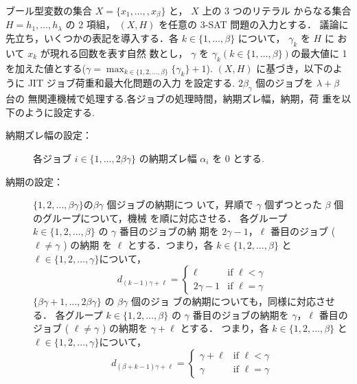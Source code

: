 \documentclass[12pt]{optlab-bachelor}
\begin{document}
ブール型変数の集合 $X = \{x_1,\ldots,,x_β\}$ と， $X$ 上の 3 つのリテラル
からなる集合 $H = {h_1,\ldots,h_{\lambda}}$ の 2 項組， $(X,H)$ を任意の
\textsc{3-SAT} 問題の入力とする．
議論に先立ち，いくつかの表記を導入する．各 $k \in \{1,\ldots,\beta\}$
について， $\gamma_k$ を $H$ に おいて $x_k$ が現れる回数を表す自然
数とし， $\gamma$ を $\gamma_k ( k \in \{1,\ldots,\beta\} )$の最大値に
1 を加えた値とする($\displaystyle \gamma = \max_{k \in \{1,2,\ldots, \beta\}} \{\gamma_k \}+ 1$).
$(X, H)$ に基づき，以下のように JIT ジョブ荷重和最大化問題の入力
を設定する. $2\beta_{\gamma}$ 個のジョブを $\lambda + \beta$ 台の
無関連機械で処理する.各ジョブの処理時間，納期ズレ幅，納期，荷
重を以下のように設定する.

\begin{description}
  \item[納期ズレ幅の設定：]
  各ジョブ $i \in \{1,\ldots,2\beta \gamma\}$ の納期ズレ幅
  $\alpha_i$ を 0 とする.
  \item[納期の設定：] $\{1,2,\ldots, \beta \gamma\}$$ の $$\beta \gamma$ 個ジョブの納期につ
  いて，昇順で $\gamma$ 個ずつとった $\beta$ 個のグループについて，機械
  を順に対応させる．
  各グループ $k \in \{1,2,\ldots, \beta\}$ の $\gamma$ 番目のジョブの納
  期を $2\gamma - 1$，$\ell$ 番目のジョブ ( $\ell \neq \gamma$ ) の納期
  を $\ell$ とする．つまり，各 $k \in \{1,2,\ldots, \beta\}$ と $\ell \in \{1,2,\ldots,
  \gamma\}$について，
  \begin{displaymath}
    d_{(k - 1)\gamma + \ell} = \left\{ \begin{array}{ll} \ell & \text{if } \ell < \gamma \\ 2\gamma - 1 & \text{if } \ell = \gamma \end{array} \right.
  \end{displaymath}
  $\{\beta \gamma + 1,\ldots, 2\beta \gamma\}$ の $\beta \gamma$ 個のジョ
  ブの納期についても，同様に対応させる．
  各グループ $k \in \{1,2,\ldots, \beta\}$ の $\gamma$ 番目のジョブの納期を $\gamma$，$\ell$ 番目のジョブ ( $\ell \neq \gamma$ ) の納期を $\gamma + \ell$ とする．
  つまり，各 $k \in \{1,2,\ldots, \beta\}$ と $\ell \in \{1,2,\ldots,
  \gamma\}$について，
  \begin{displaymath}
    d_{(\beta + k - 1)\gamma + \ell} = \left\{ \begin{array}{ll}\gamma +  \ell & \text{if } \ell < \gamma \\ \gamma & \text{if } \ell = \gamma \end{array} \right.
  \end{displaymath}

\end{description}
\end{document}
